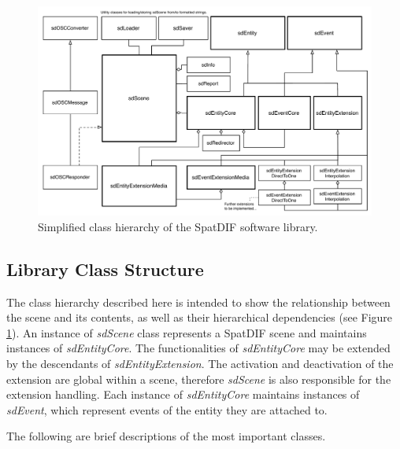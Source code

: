\documentclass{article}
\begin{document}
\begin{figure}[h]
	\centering
	\includegraphics[width=0.95\columnwidth]{class_diagram.pdf}
	\caption{Simplified class hierarchy of the SpatDIF software library.
	\label{fig:class_structure}
}
\end{figure}

\subsection{Library Class Structure}\label{subsec:class_structure}

The class hierarchy described here is intended to show the relationship between the scene and its contents, as well as their hierarchical dependencies (see Figure \ref{fig:class_structure}). 
An instance of \emph{sdScene} class represents a SpatDIF scene and maintains instances of \emph{sdEntityCore}. The functionalities of \emph{sdEntityCore} may be extended by the descendants of \emph{sdEntityExtension}. 
The activation and deactivation of the extension are global within a scene, therefore \emph{sdScene} is also responsible for the extension handling.
Each instance of \emph{sdEntityCore} maintains instances of \emph{sdEvent}, which represent events of the entity they are attached to.

The following are brief descriptions of the most important classes.
\end{document}
